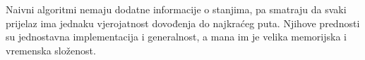 Naivni algoritmi  nemaju dodatne informacije o stanjima, pa smatraju da svaki prijelaz ima jednaku vjerojatnost dovođenja do najkraćeg puta. 
Njihove prednosti su jednostavna implementacija i generalnost, a mana im je velika memorijska i vremenska složenost. 
